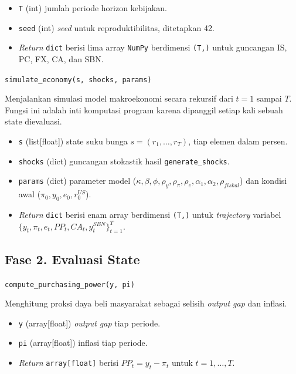 \begin{itemize}
    \item \texttt{T} (int) jumlah periode horizon kebijakan.
    \item \texttt{seed} (int) \textit{seed} untuk reproduktibilitas, ditetapkan 42.
    \item \textit{Return} \texttt{dict} berisi lima array \texttt{NumPy} berdimensi \texttt{(T,)} untuk guncangan IS, PC, FX, CA, dan SBN.
\end{itemize}

\texttt{simulate\_economy(s, shocks, params)}

Menjalankan simulasi model makroekonomi secara rekursif dari $t = 1$ sampai $T$. Fungsi ini adalah inti komputasi program karena dipanggil setiap kali sebuah state dievaluasi.

\begin{itemize}
    \item \texttt{s} (list[float]) state suku bunga $s = (r_1, \dots, r_T)$, tiap elemen dalam persen.
    \item \texttt{shocks} (dict) guncangan stokastik hasil \texttt{generate\_shocks}.
    \item \texttt{params} (dict) parameter model ($\kappa, \beta, \phi, \rho_y, \rho_\pi, \rho_e, \alpha_1, \alpha_2, \rho_{fiskal}$) dan kondisi awal ($\pi_0, y_0, e_0, r_0^{US}$).
    \item \textit{Return} \texttt{dict} berisi enam array berdimensi \texttt{(T,)} untuk \textit{trajectory} variabel $\{y_t, \pi_t, e_t, PP_t, CA_t, y_t^{SBN}\}_{t=1}^{T}$.
\end{itemize}

\subsection*{Fase 2. Evaluasi State}

\texttt{compute\_purchasing\_power(y, pi)}

Menghitung proksi daya beli masyarakat sebagai selisih \textit{output gap} dan inflasi.

\begin{itemize}
    \item \texttt{y} (array[float]) \textit{output gap} tiap periode.
    \item \texttt{pi} (array[float]) inflasi tiap periode.
    \item \textit{Return} \texttt{array[float]} berisi $PP_t = y_t - \pi_t$ untuk $t = 1, \dots, T$.
\end{itemize}


